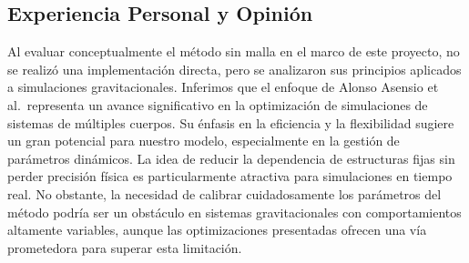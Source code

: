 \subsection{Experiencia Personal y Opinión}

Al evaluar conceptualmente el método sin malla en el marco de este proyecto, no se realizó una implementación directa, pero se analizaron sus principios aplicados a simulaciones gravitacionales. Inferimos que el enfoque de Alonso Asensio et al.\ representa un avance significativo en la optimización de simulaciones de sistemas de múltiples cuerpos. Su énfasis en la eficiencia y la flexibilidad sugiere un gran potencial para nuestro modelo, especialmente en la gestión de parámetros dinámicos. La idea de reducir la dependencia de estructuras fijas sin perder precisión física es particularmente atractiva para simulaciones en tiempo real. No obstante, la necesidad de calibrar cuidadosamente los parámetros del método podría ser un obstáculo en sistemas gravitacionales con comportamientos altamente variables, aunque las optimizaciones presentadas ofrecen una vía prometedora para superar esta limitación.